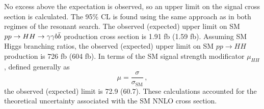 No excess above the expectation is observed, so an upper limit on the signal cross section is
calculated. The 95\% CL is found using the same approach as in both
regimes of the resonant search. The observed (expected) upper limit on SM
$pp \rightarrow HH \rightarrow \gamma\gamma b\bar{b}$ production cross section is 1.91 fb (1.59 fb).
Assuming SM Higgs branching ratios, the observed (expected) upper limit on SM $pp \rightarrow HH$
production is 726 fb (604 fb). In terms of the SM signal strength modificator $\mu_{HH}$, defined
generally as
\begin{equation}
\mu = \frac{\sigma}{\sigma_\text{SM}} \, ,
\end{equation}
the observed (expected) limit is 72.9 (60.7). These calculations accounted for the theoretical
uncertainty associated with the SM NNLO cross section.


